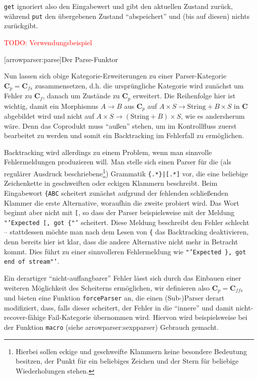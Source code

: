 \documentclass[12pt, a4paper, bibgerm]{scrbook}
\newcommand\icode[1]{\lstinline?#1?}
\newcommand{\todo}[1]{
  \textcolor{red}{TODO: #1}
}
\newcommand\lsection{}
\newcommand\sref{}
\newcommand\ato{\rightarrow} %
\newcommand{\sees}[1]{(siehe \sref{#1})}
\begin{document}
\icode{get} ignoriert also den Eingabewert und gibt den aktuellen
Zustand zurück, während \icode{put} den übergebenen Zustand
"`abspeichert"' und (bis auf diesen) nichts zurückgibt.

\todo{Verwendungsbeispiel}

\lsection[arrowparser:parse]{Der Parse-Funktor}

Nun lassen sich obige Kategorie-Erweiterungen zu einer Parser-Kategorie
$\mathbf{C}_p = \mathbf{C}_{fs}$ zusammensetzen, d.h. die ursprüngliche
Kategorie wird zunächst um Fehler zu $\mathbf{C}_f$, danach um Zustände
zu $\mathbf{C}_p$ erweitert. Die Reihenfolge hier ist wichtig, damit ein
Morphismus $A \ato B$ aus $\mathbf{C}_p$ auf $A \times S \ato
\mathrm{String} + B \times S$ in $\mathbf{C}$ abgebildet wird und nicht
auf $A \times S \ato (\mathrm{String} + B) \times S$, wie es andersherum
wäre. Denn das Coprodukt muss "`außen"' stehen, um im Kontrollfluss
zuerst bearbeitet zu werden und somit ein Backtracking im Fehlerfall zu
ermöglichen.

Backtracking wird allerdings zu einem Problem, wenn man sinnvolle
Fehlermeldungen produzieren will. Man stelle sich einen Parser für die
(als regulärer Ausdruck beschriebene\footnote{Hierbei sollen eckige und
  geschweifte Klammern keine besondere Bedeutung besitzen, der Punkt für
  ein beliebiges Zeichen und der Stern für beliebige Wiederholungen
  stehen.}) Grammatik \texttt{\{.*\}|[.*]} vor, die eine beliebige
Zeichenkette in geschweiften oder eckigen Klammern beschreibt. Beim
Eingabewort \texttt{\{ABC} scheitert zunächst aufgrund der fehlenden
schließenden Klammer die erste Alternative, woraufhin die zweite
probiert wird. Das Wort beginnt aber nicht mit \texttt{[}, so dass der
  Parser beispielsweise mit der Meldung \texttt{"'Expected [, got \{"'}
    scheitert. Diese Meldung beschreibt den Fehler schlecht --
    stattdessen möchte man nach dem Lesen von \texttt{\{} das
    Backtracking deaktivieren, denn bereits hier ist klar, dass die
    andere Alternative nicht mehr in Betracht kommt. Dies führt zu einer
    sinnvolleren Fehlermeldung wie \texttt{"'Expected \}, got end of
      stream"'}.

Ein derartiger "`nicht-auffangbarer"' Fehler lässt sich durch das
Einbauen einer weiteren Möglichkeit des Scheiterns ermöglichen, wir
definieren also $\mathbf{C}_p = \mathbf{C}_{ffs}$ und bieten eine
Funktion \icode{forceParser} an, die einen (Sub-)Parser derart
modifiziert, dass, falls dieser scheitert, der Fehler in die "`innere"'
und damit nicht-recover-fähige Fail-Kategorie übernommen wird. Hiervon
wird beispielsweise bei der Funktion \icode{macro}
\sees{arrowparser:sexpparser} Gebrauch gemacht.
\end{document}
